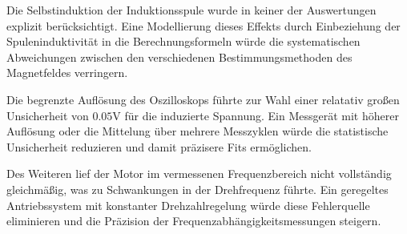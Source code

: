 Die Selbstinduktion der Induktionsspule wurde in keiner der Auswertungen explizit berücksichtigt. Eine Modellierung dieses Effekts durch Einbeziehung der Spuleninduktivität in die Berechnungsformeln würde die systematischen Abweichungen zwischen den verschiedenen Bestimmungsmethoden des Magnetfeldes verringern.

Die begrenzte Auflösung des Oszilloskops führte zur Wahl einer relatativ großen Unsicherheit von $0.05$V für die induzierte Spannung. Ein Messgerät mit höherer Auflösung oder die Mittelung über mehrere Messzyklen würde die statistische Unsicherheit reduzieren und damit präzisere Fits ermöglichen.

Des Weiteren lief der Motor im vermessenen Frequenzbereich nicht vollständig gleichmäßig, was zu Schwankungen in der Drehfrequenz führte. Ein geregeltes Antriebssystem mit konstanter Drehzahlregelung würde diese Fehlerquelle eliminieren und die Präzision der Frequenzabhängigkeitsmessungen steigern.